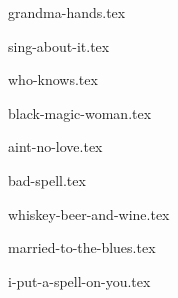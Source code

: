 \begin{songs}{}
  {grandma-hands.tex}
  \sclearpage
    
  {sing-about-it.tex}
  \sclearpage
    
  {who-knows.tex}
  \sclearpage

  {black-magic-woman.tex}
  \sclearpage

  {aint-no-love.tex}
  \sclearpage
    
  {bad-spell.tex}
  \sclearpage
  
  {whiskey-beer-and-wine.tex}
  \sclearpage

  {married-to-the-blues.tex}
  \sclearpage

  {i-put-a-spell-on-you.tex}
  \sclearpage
    
 \end{songs}
